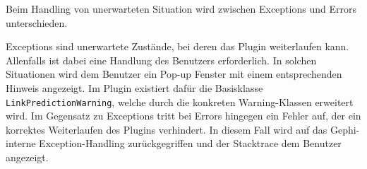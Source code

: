 Beim Handling von unerwarteten Situation wird zwischen Exceptions und Errors unterschieden.

Exceptions sind unerwartete Zustände, bei deren das Plugin weiterlaufen kann. Allenfalls ist dabei eine Handlung des Benutzers erforderlich.
In solchen Situationen wird dem Benutzer ein Pop-up Fenster mit einem entsprechenden Hinweis angezeigt.
Im Plugin existiert dafür die Basisklasse \texttt{LinkPredictionWarning}, welche durch die konkreten Warning-Klassen erweitert wird.
Im Gegensatz zu Exceptions tritt bei Errors hingegen ein Fehler auf, der ein korrektes Weiterlaufen des Plugins verhindert.
In diesem Fall wird auf das Gephi-interne Exception-Handling zurückgegriffen und der Stacktrace dem Benutzer angezeigt.


